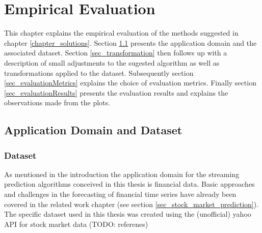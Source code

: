 \chapter{Empirical Evaluation}
\label{chapter_evaluation}

\ifpdf
    \graphicspath{{Chapter5/Figs/Raster/}{Chapter5/Figs/PDF/}{Chapter5/Figs/}}
\else
    \graphicspath{{Chapter5/Figs/Vector/}{Chapter5/Figs/}}
\fi

This chapter explains the empirical evaluation of the methods suggested in chapter \ref{chapter_solutions}. Section \ref{sec_applicationDomain} presents the application domain and the associated dataset. Section \ref{sec_transformation} then follows up with a description of small adjustments to the sugested algorithm as well as transformations applied to the dataset. Subsequently section \ref{sec_evaluationMetrics} explains the choice of evaluation metrics. Finally section \ref{sec_evaluationResults} presents the evaluation results and explains the observations made from the plots.

\section{Application Domain and Dataset}
\label{sec_applicationDomain}

\subsection{Dataset}
As mentioned in the introduction the application domain for the streaming prediction algorithms conceived in this thesis is financial data. Basic approaches and challenges in the forecasting of financial time series have already been covered in the related work chapter (see section \ref{sec_stock_market_prediction}). The specific dataset used in this thesis was created using the (unofficial) yahoo API for stock market data (TODO: referenes)
\\

